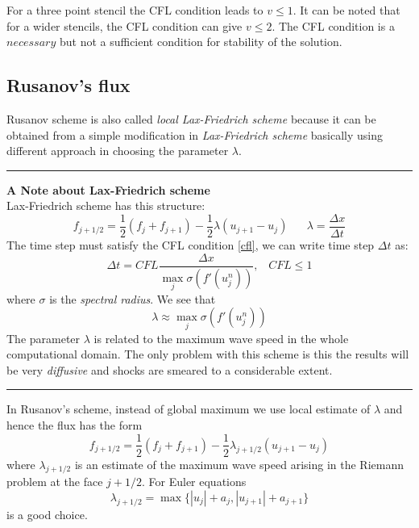For a three point stencil the CFL condition leads to $v \leq 1$. It can be noted that for a wider stencils, the CFL condition can give $v \leq 2$. The CFL condition is a $necessary$ but not a sufficient condition for stability of the solution.
\subsection{Rusanov's flux}
Rusanov scheme \cite{rusanov} is also called {\em local Lax-Friedrich scheme} \cite{notes_ncm} because it can be obtained from a simple modification in {\em Lax-Friedrich scheme} basically using different approach in choosing the parameter $\lambda$. \vspace{8pt}
\hrule \vspace{10pt}
\hspace{-17pt}\textbf{A Note about Lax-Friedrich scheme}\\
Lax-Friedrich scheme has this structure:
\begin{equation}
    f_{j+1/2} = \frac{1}{2}\left(f_j + f_{j+1} \right) - \frac{1}{2}\lambda \left(u_{j+1} - u_j \right) \hspace{20pt} \lambda = \frac{\Delta x}{\Delta t}
\end{equation} 
The time step must satisfy the CFL condition \ref{cfl}, we can write time step $\Delta t$ as:
\begin{equation*}
    \Delta t = CFL\frac{\Delta x}{\max\limits_{j} \sigma(f'(u_j^n))}, \hspace{10pt} CFL \leq 1
\end{equation*}
where $\sigma$ is the {\em spectral radius}. We see that
\begin{equation*}
    \lambda \approx \max\limits_j \sigma(f'(u_j^n))
\end{equation*}
The parameter $\lambda$ is related to the maximum wave speed in the whole computational domain. The only problem with this scheme is this the results will be very {\em diffusive} and shocks are smeared to a considerable extent.
\vspace{5pt} \hrule \vspace{5pt}
In Rusanov's scheme, instead of global maximum we use local estimate of $\lambda$ and hence the flux has the form
\begin{equation}
    f_{j+1/2} = \frac{1}{2}(f_j + f_{j+1}) - \frac{1}{2} \lambda_{j+1/2}(u_{j+1} - u_j)
\end{equation}
where $\lambda_{j+1/2}$ is an estimate of the maximum wave speed arising in the Riemann problem at the face $j+1/2$. For Euler equations
\begin{equation*}
    \lambda_{j+1/2} = \max\{|u_j| + a_j, |u_{j+1}| + a_{j+1}\}
\end{equation*} is a good choice.

